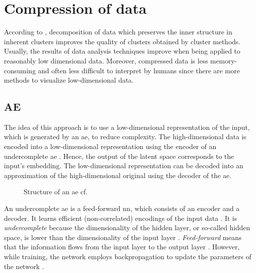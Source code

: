 \section{Compression of data}\label{sec:compression}

According to \citeauthor{clusteringDocs2020}, decomposition of data which preserves the inner structure in inherent clusters 
improves the quality of clusters obtained by cluster methods.
Usually, the results of data analysis techniques improve when being applied to reasonably low dimensional data.
Moreover, compressed data is less memory-consuming and often less difficult to interpret by humans 
since there are more methods to visualize low-dimensional data.

\subsection{AE}\label{subsec:autoencoder}

The idea of this approach is to use a low-dimensional representation of the input, which is generated by an \ac{ae}, to reduce complexity.
The high-dimensional data is encoded into a low-dimensional representation using the encoder of an undercomplete \ac{ae} \cite{autoencoder2020}.
Hence, the output of the latent space corresponds to the input's embedding. 
The low-dimensional representation can be decoded into an approximation of the high-dimensional original using the decoder of the \ac{ae}.

\begin{figure}[h] %
    \centering
    
    \caption[Structure of an \ac{ae}]
    {Structure of an \ac{ae} cf. \cite{autoencoder2020}}
    \label{fig:ae}
\end{figure}

An undercomplete \ac{ae} is a feed-forward \ac{nn}, which consists of an encoder and a decoder.
It learns efficient (non-correlated) encodings of the input data \cite{autoencoder2020}.
It is \textit{undercomplete} because the dimensionality of the hidden layer, or so-called hidden space, 
is lower than the dimensionality of the input layer \cite{seminar_ies}.
\textit{Feed-forward} means that the information flows from the input layer to the output layer \cite{seminar_ies}.
However, while training, the network employs backpropagation to update the parameters of the network \cite{seminar_ies}.


